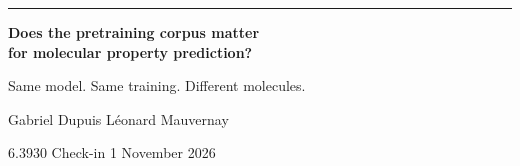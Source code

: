 \documentclass[aspectratio=169,10pt]{beamer}
\newcommand{\muted}[1]{\textcolor{ink2}{#1}}
\begin{document}
\begin{frame}[plain]
\vspace{16mm}
{\color{accent}\rule{18mm}{1.2mm}}\par\vspace{5mm}
{\fontsize{25}{31}\selectfont\bfseries Does the pretraining corpus matter\\
for molecular property prediction?\par}
\vspace{6mm}
{\Large\muted{Same model. Same training. Different molecules.}\par}
\vfill
{\large Gabriel Dupuis \qquad L\'eonard Mauvernay\par}
\vspace{1.5mm}
{\muted{6.3930 \;\textbullet\; Check-in 1 \;\textbullet\; November 2026}\par}
\vspace{9mm}
\end{frame}
\end{document}
